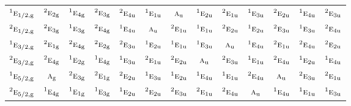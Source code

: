 \documentclass[10pt,a4paper]{article}
\numberwithin{equation}{section}
\newcommand{\irr}[1]{\text{\normalfont\scshape #1}}
\newcommand{\conjpair}[1]{{}^{#1}}
\newcommand{\ptag}[1]{\mathrm{#1}}
\begin{document}
{\begin{longtable}{@{}lcccccccccccc@{}}
$\conjpair{1}\irr{e}_{1/2,\ptag{g}}$ & $\conjpair{2}\irr{e}_{2\ptag{g}}$ & $\conjpair{1}\irr{e}_{4\ptag{g}}$ & $\conjpair{2}\irr{e}_{3\ptag{g}}$ & $\conjpair{2}\irr{e}_{4\ptag{u}}$ & $\conjpair{1}\irr{e}_{1\ptag{u}}$ & $\irr{a}_{\ptag{u}}$ & $\conjpair{1}\irr{e}_{2\ptag{u}}$ & $\conjpair{2}\irr{e}_{1\ptag{u}}$ & $\conjpair{1}\irr{e}_{3\ptag{u}}$ & $\conjpair{2}\irr{e}_{2\ptag{u}}$ & $\conjpair{1}\irr{e}_{4\ptag{u}}$ & $\conjpair{2}\irr{e}_{3\ptag{u}}$\\
$\conjpair{2}\irr{e}_{1/2,\ptag{g}}$ & $\conjpair{2}\irr{e}_{3\ptag{g}}$ & $\conjpair{1}\irr{e}_{3\ptag{g}}$ & $\conjpair{2}\irr{e}_{4\ptag{g}}$ & $\conjpair{1}\irr{e}_{4\ptag{u}}$ & $\irr{a}_{\ptag{u}}$ & $\conjpair{2}\irr{e}_{1\ptag{u}}$ & $\conjpair{1}\irr{e}_{1\ptag{u}}$ & $\conjpair{2}\irr{e}_{2\ptag{u}}$ & $\conjpair{1}\irr{e}_{2\ptag{u}}$ & $\conjpair{2}\irr{e}_{3\ptag{u}}$ & $\conjpair{1}\irr{e}_{3\ptag{u}}$ & $\conjpair{2}\irr{e}_{4\ptag{u}}$\\
$\conjpair{1}\irr{e}_{3/2,\ptag{g}}$ & $\conjpair{2}\irr{e}_{1\ptag{g}}$ & $\conjpair{2}\irr{e}_{4\ptag{g}}$ & $\conjpair{2}\irr{e}_{2\ptag{g}}$ & $\conjpair{2}\irr{e}_{3\ptag{u}}$ & $\conjpair{1}\irr{e}_{2\ptag{u}}$ & $\conjpair{1}\irr{e}_{1\ptag{u}}$ & $\conjpair{1}\irr{e}_{3\ptag{u}}$ & $\irr{a}_{\ptag{u}}$ & $\conjpair{1}\irr{e}_{4\ptag{u}}$ & $\conjpair{2}\irr{e}_{1\ptag{u}}$ & $\conjpair{2}\irr{e}_{4\ptag{u}}$ & $\conjpair{2}\irr{e}_{2\ptag{u}}$\\
$\conjpair{2}\irr{e}_{3/2,\ptag{g}}$ & $\conjpair{2}\irr{e}_{4\ptag{g}}$ & $\conjpair{1}\irr{e}_{2\ptag{g}}$ & $\conjpair{1}\irr{e}_{4\ptag{g}}$ & $\conjpair{1}\irr{e}_{3\ptag{u}}$ & $\conjpair{2}\irr{e}_{1\ptag{u}}$ & $\conjpair{2}\irr{e}_{2\ptag{u}}$ & $\irr{a}_{\ptag{u}}$ & $\conjpair{2}\irr{e}_{3\ptag{u}}$ & $\conjpair{1}\irr{e}_{1\ptag{u}}$ & $\conjpair{2}\irr{e}_{4\ptag{u}}$ & $\conjpair{1}\irr{e}_{2\ptag{u}}$ & $\conjpair{1}\irr{e}_{4\ptag{u}}$\\
$\conjpair{1}\irr{e}_{5/2,\ptag{g}}$ & $\irr{a}_{\ptag{g}}$ & $\conjpair{2}\irr{e}_{3\ptag{g}}$ & $\conjpair{2}\irr{e}_{1\ptag{g}}$ & $\conjpair{2}\irr{e}_{2\ptag{u}}$ & $\conjpair{1}\irr{e}_{3\ptag{u}}$ & $\conjpair{1}\irr{e}_{2\ptag{u}}$ & $\conjpair{1}\irr{e}_{4\ptag{u}}$ & $\conjpair{1}\irr{e}_{1\ptag{u}}$ & $\conjpair{2}\irr{e}_{4\ptag{u}}$ & $\irr{a}_{\ptag{u}}$ & $\conjpair{2}\irr{e}_{3\ptag{u}}$ & $\conjpair{2}\irr{e}_{1\ptag{u}}$\\
$\conjpair{2}\irr{e}_{5/2,\ptag{g}}$ & $\conjpair{1}\irr{e}_{4\ptag{g}}$ & $\conjpair{1}\irr{e}_{1\ptag{g}}$ & $\conjpair{1}\irr{e}_{3\ptag{g}}$ & $\conjpair{1}\irr{e}_{2\ptag{u}}$ & $\conjpair{2}\irr{e}_{2\ptag{u}}$ & $\conjpair{2}\irr{e}_{3\ptag{u}}$ & $\conjpair{2}\irr{e}_{1\ptag{u}}$ & $\conjpair{2}\irr{e}_{4\ptag{u}}$ & $\irr{a}_{\ptag{u}}$ & $\conjpair{1}\irr{e}_{4\ptag{u}}$ & $\conjpair{1}\irr{e}_{1\ptag{u}}$ & $\conjpair{1}\irr{e}_{3\ptag{u}}$\\

\end{longtable}}
\end{document}
